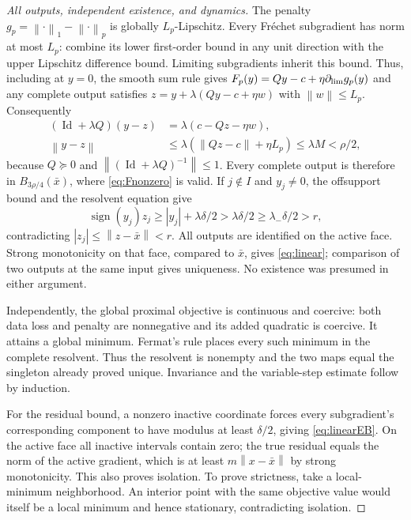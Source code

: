 \documentclass[11pt]{article}
\newcommand{\norm}[1]{\left\lVert#1\right\rVert}
\newcommand{\Id}{\operatorname{Id}}
\theoremstyle{remark}\newtheorem{remark}[theorem]{Remark}
\begin{document}
\begin{proof}[All outputs, independent existence, and dynamics]
The penalty $g_p=\norm{\cdot}_1-\norm{\cdot}_p$ is globally
$L_p$-Lipschitz. Every Fr\'echet subgradient has norm at most $L_p$:
combine its lower first-order bound in any unit direction with the
upper Lipschitz difference bound. Limiting subgradients inherit this
bound. Thus, including at $y=0$, the smooth sum rule gives
$F_p(y)=Qy-c+\eta\partial_{\rm lim}g_p(y)$ and any complete output
satisfies $z=y+\lambda(Qy-c+\eta w)$ with $\norm w\le L_p$.
Consequently
\begin{align}\label{eq:remote}
 (\Id+\lambda Q)(y-z)&=\lambda(c-Qz-\eta w),\nonumber\\
 \norm{y-z}&\le\lambda(\norm{Qz-c}+\eta L_p)\le\lambda M<\rho/2,
\end{align}
because $Q\succeq0$ and $\norm{(\Id+\lambda Q)^{-1}}\le1$.
Every complete output is therefore in $B_{3\rho/4}(\bar x)$,
where \eqref{eq:Fnonzero} is valid. If $j\notin I$ and $y_j\ne0$,
the offsupport bound and the resolvent equation give
\[
 \operatorname{sign}(y_j)z_j\ge |y_j|+\lambda\delta/2
 >\lambda\delta/2\ge\lambda_-\delta/2>r,
\]
contradicting $|z_j|\le\norm{z-\bar x}<r$.
All outputs are identified on the active face. Strong monotonicity on
that face, compared to $\bar x$, gives \eqref{eq:linear}; comparison
of two outputs at the same input gives uniqueness. No existence was
presumed in either argument.

Independently, the global proximal objective is continuous and coercive:
both data loss and penalty are nonnegative and its added quadratic is
coercive. It attains a global minimum. Fermat's rule places every such
minimum in the complete resolvent. Thus the resolvent is nonempty and
the two maps equal the singleton already proved unique. Invariance and
the variable-step estimate follow by induction.

For the residual bound, a nonzero inactive coordinate forces every
subgradient's corresponding component to have modulus at least
$\delta/2$, giving \eqref{eq:linearEB}. On the active face all inactive
intervals contain zero; the true residual equals the norm of the active
gradient, which is at least $m\norm{x-\bar x}$ by strong monotonicity.
This also proves isolation. To prove strictness, take a local-minimum
neighborhood. An interior point with the same objective value would
itself be a local minimum and hence stationary, contradicting isolation.
\end{proof}
\end{document}
